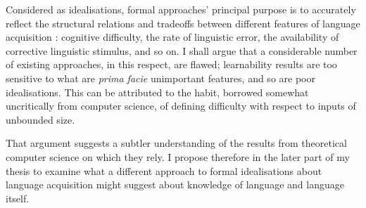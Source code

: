 Considered as idealisations, formal approaches’ principal purpose is to accurately reflect the structural relations and tradeoffs between different features of language acquisition \parencite[close to the `minimal idealisation' of][]{weisberg2007}: cognitive difficulty, the rate of linguistic error, the availability of corrective linguistic stimulus, and so on. I shall argue that a considerable number of existing approaches, in this respect, are flawed; learnability results are too sensitive to what are \emph{prima facie} unimportant features, and so are poor idealisations. This can be attributed to the habit, borrowed somewhat uncritically from computer science, of defining difficulty with respect to inputs of unbounded size.

That argument suggests a subtler understanding of the results from theoretical computer science on which they rely. I propose therefore in the later part of my thesis to examine what a different approach to formal idealisations about language acquisition might suggest about knowledge of language and language itself.
